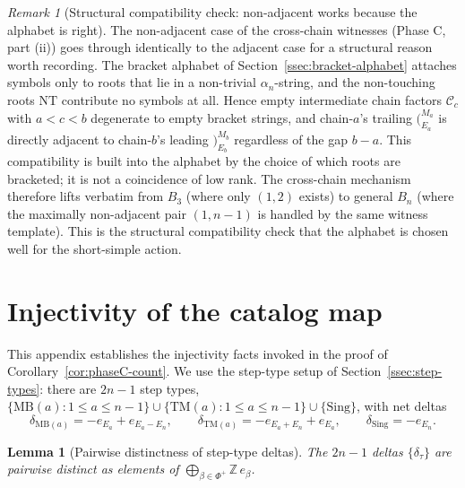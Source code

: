 \documentclass[11pt]{article}
\newtheorem{lemma}[theorem]{Lemma}
\theoremstyle{definition}
\theoremstyle{remark}
\newtheorem{remark}[theorem]{Remark}
\newcommand{\NT}{\mathrm{NT}}
\newcommand{\Sing}{\mathrm{Sing}}
\newcommand{\MB}{\mathrm{MB}}
\newcommand{\TM}{\mathrm{TM}}
\newcommand{\Cmid}{\mathcal{C}}
\newcommand{\labr}[1]{{)}_{#1}}
\newcommand{\labl}[1]{{(}_{#1}}
\begin{document}
\begin{remark}[Structural compatibility check: non-adjacent works because the alphabet is right]\label{rmk:non-adjacent-compatibility}
The non-adjacent case of the cross-chain witnesses (Phase C, part (ii)) goes
through identically to the adjacent case for a structural reason worth recording.
The bracket alphabet of Section~\ref{ssec:bracket-alphabet} attaches symbols only
to roots that lie in a non-trivial $\alpha_n$-string, and the non-touching roots
$\NT$ contribute no symbols at all. Hence empty intermediate chain factors
$\Cmid_c$ with $a < c < b$ degenerate to empty bracket strings, and chain-$a$'s
trailing $\labl{E_a}^{M_a}$ is directly adjacent to chain-$b$'s leading
$\labr{E_b}^{M_b}$ regardless of the gap $b - a$. This compatibility is built
into the alphabet by the choice of which roots are bracketed; it is not a
coincidence of low rank. The cross-chain mechanism therefore lifts verbatim from
$B_3$ (where only $(1, 2)$ exists) to general $B_n$ (where the maximally
non-adjacent pair $(1, n-1)$ is handled by the same witness template). This is
the structural compatibility check that the alphabet is chosen well for the
short-simple action.
\end{remark}

\appendix
\section{Injectivity of the catalog map}\label{sec:appendix-injectivity}

This appendix establishes the injectivity facts invoked in the proof of
Corollary~\ref{cor:phaseC-count}. We use the step-type setup of
Section~\ref{ssec:step-types}: there are $2n - 1$ step types,
$\{\MB(a) : 1 \leq a \leq n-1\} \cup \{\TM(a) : 1 \leq a \leq n-1\} \cup \{\Sing\}$,
with net deltas
\[
\delta_{\MB(a)} = -e_{E_a} + e_{E_a - E_n},
\qquad
\delta_{\TM(a)} = -e_{E_a + E_n} + e_{E_a},
\qquad
\delta_{\Sing} = -e_{E_n}.
\]

\begin{lemma}[Pairwise distinctness of step-type deltas]\label{lem:appendix-distinctness}
The $2n - 1$ deltas $\{\delta_\tau\}$ are pairwise distinct as elements of
$\bigoplus_{\beta \in \Phi^+} \mathbb{Z}\, e_\beta$.
\end{lemma}
\end{document}
